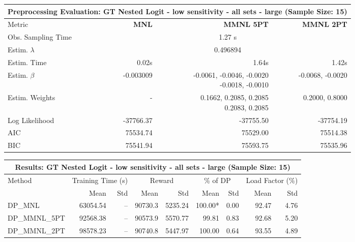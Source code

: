 
\begin{samepage}
\begin{center}
  \small
  \begin{tabular}{l|r|r|r}
    \toprule
    \multicolumn{4}{c}{\textbf{Preprocessing Evaluation: GT Nested Logit - low sensitivity - all sets - large (Sample Size: 15)}} \\
    \midrule
    Metric & \textbf{MNL} & \textbf{MMNL 5PT} & \textbf{MMNL 2PT} \\
    \midrule
    Obs. Sampling Time & \multicolumn{3}{c}{1.27 s} \\
    Estim. $\lambda$ & \multicolumn{3}{c}{0.496894} \\
    Estim. Time & 0.02s & 1.64s & 1.42s \\
    Estim. $\beta$ & -0.003009 & \makecell[tr]{-0.0061, -0.0046, -0.0020 \\ -0.0018, -0.0010} & -0.0068, -0.0020 \\
    Estim. Weights & - & \makecell[tr]{0.1662, 0.2085, 0.2085 \\ 0.2083, 0.2085} & 0.2000, 0.8000 \\
    Log Likelihood & -37766.37 & -37755.50 & -37754.19 \\
    AIC & 75534.74 & 75529.00 & 75514.38 \\
    BIC & 75541.94 & 75593.75 & 75535.96 \\
    \bottomrule
  \end{tabular}
\end{center}
\begin{center}
  \small
  \begin{tabular}{l|rr|rr|rr|rr}
    \toprule
    \multicolumn{9}{c}{\textbf{Results: GT Nested Logit - low sensitivity - all sets - large (Sample Size: 15)}} \\
    \midrule
    Method & \multicolumn{2}{c|}{Training Time (s)} & \multicolumn{2}{c|}{Reward} & \multicolumn{2}{c|}{\% of DP} & \multicolumn{2}{c}{Load Factor (\%)} \\
    & Mean & Std & Mean & Std & Mean & Std & Mean & Std \\
    \midrule
    DP\_MNL      & 63054.54 &    -- &    90730.3 &    5235.24 & 100.00* &    0.00 &   92.47 &    4.76 \\
    DP\_MMNL\_5PT & 92568.38 &    -- &    90573.9 &    5570.77 &   99.81 &    0.83 &   92.68 &    5.20 \\
    DP\_MMNL\_2PT & 98578.23 &    -- &    90740.8 &    5447.97 &  100.00 &    0.64 &   93.55 &    4.89 \\

\end{tabular}
\end{center}
\end{samepage}
